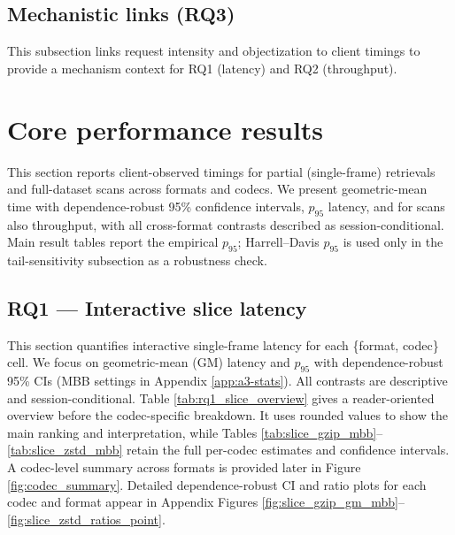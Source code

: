 \documentclass[nomenclature, english, bibtex]{kththesis}
\numberwithin{listing}{chapter}
\begin{document}
\subsection{Mechanistic links (RQ3)}
This subsection links request intensity and objectization to client timings to provide a mechanism context for RQ1 (latency) and RQ2 (throughput).

\section{Core performance results}
\label{sec:core-results}
This section reports client-observed timings for partial (single-frame) retrievals and full-dataset scans across formats and codecs. We present geometric-mean time with dependence-robust 95\% confidence intervals, $p_{95}$ latency, and for scans also throughput, with all cross-format contrasts described as session-conditional. Main result tables report the empirical $p_{95}$; Harrell–Davis $p_{95}$ is used only in the tail-sensitivity subsection as a robustness check.

\subsection{RQ1 — Interactive slice latency}
\label{sec:rq1-results}
This section quantifies interactive single-frame latency for each \{format, codec\} cell. We focus on geometric-mean (\gls{GM}) latency and $p_{95}$ with dependence-robust 95\% \glspl{CI} (\gls{MBB} settings in Appendix \ref{app:a3-stats}). All contrasts are descriptive and session-conditional. Table \ref{tab:rq1_slice_overview} gives a reader-oriented overview before the codec-specific breakdown. It uses rounded values to show the main ranking and interpretation, while Tables \ref{tab:slice_gzip_mbb}--\ref{tab:slice_zstd_mbb} retain the full per-codec estimates and confidence intervals. A codec-level summary across formats is provided later in Figure \ref{fig:codec_summary}. Detailed dependence-robust \gls{CI} and ratio plots for each codec and format appear in Appendix Figures \ref{fig:slice_gzip_gm_mbb}--\ref{fig:slice_zstd_ratios_point}.
\end{document}
